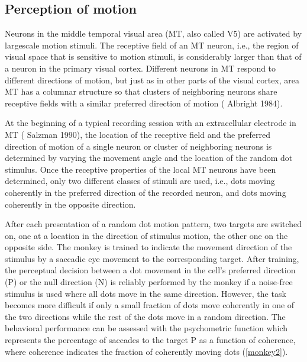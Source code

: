 \documentclass[12pt,hyperref,a4paper,UTF8]{ctexart}
\begin{document}
\subsection{Perception of motion}

Neurons in the middle temporal visual area (MT, also called V5) are activated by largescale motion stimuli. The receptive field of an MT neuron, i.e., the region of visual space that is sensitive to motion stimuli, is considerably larger than that of a neuron in the primary visual cortex. Different neurons in MT respond to different directions of motion, but just as in other parts of the visual cortex, area MT has a columnar structure so that clusters of neighboring neurons share receptive fields with a similar preferred direction of motion (\cite{Albright 1984} Albright 1984).

At the beginning of a typical recording session with an extracellular electrode in MT (\cite{Salzman 1990} Salzman 1990), the location of the receptive field and the preferred direction of motion of a single neuron or cluster of neighboring neurons is determined by varying the movement angle and the location of the random dot stimulus. Once the receptive properties of the local MT neurons have been determined, only two different classes of stimuli are used, i.e., dots moving coherently in the preferred direction of the recorded neuron, and dots moving coherently in the opposite direction.

After each presentation of a random dot motion pattern, two targets are switched on, one at a location in the direction of stimulus motion, the other one on the opposite side. The monkey is trained to indicate the movement direction of the stimulus by a saccadic eye movement to the corresponding target. After training, the perceptual decision between a dot movement in the cell's preferred direction (P) or the null direction (N) is reliably performed by the monkey if a noise-free stimulus is used where all dots move in the same direction. However, the task becomes more difficult if only a small fraction of dots move coherently in one of the two directions while the rest of the dots move in a random direction. The behavioral performance can be assessed with the psychometric function which represents the percentage of saccades to the target P as a function of coherence, where coherence indicates the fraction of coherently moving dots (\autoref{monkey2}). 
\end{document}
